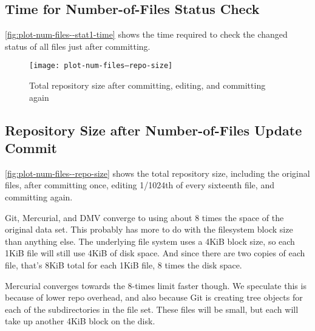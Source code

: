 \cleardoublepage

\subsection{Time for Number-of-Files Status Check}

\autoref{fig:plot-num-files--stat1-time} shows the time
required to check the changed status of all files just after committing.


%


\begin{figure}[p]
    \caption{Total repository size after committing, editing, and committing again}
    \label{fig:plot-num-files--repo-size}
    \centering

    \explaindiskspaceplot

    \texttt{[image: plot-num-files--repo-size]}
\end{figure}

\cleardoublepage

\subsection{Repository Size after Number-of-Files Update Commit}


\autoref{fig:plot-num-files--repo-size} shows the total
repository size, including the original files, after committing once, editing
1/1024th of every sixteenth file, and committing again.

Git, Mercurial, and DMV converge to using about \num{8} times the space of the
original data set. This probably has more to do with the filesystem block size
than anything else. The underlying file system uses a 4KiB block size, so each
1KiB file will still use 4KiB of disk space. And since there are two copies of
each file, that's 8KiB total for each 1KiB file, \num{8} times the disk space.


Mercurial converges towards the \num{8}-times limit faster though. We speculate
this is because of lower repo overhead, and also because Git is creating
\gls{tree} objects for each of the subdirectories in the file set. These files
will be small, but each will take up another 4KiB block on the disk.

%
